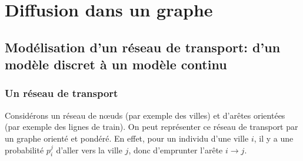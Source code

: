 \documentclass[a4paper]{article}
\theoremstyle{plain}
\theoremstyle{definition}
\theoremstyle{remark}
\begin{document}
\section{Diffusion dans un graphe}
\subsection{Modélisation d'un réseau de transport: d'un modèle discret à un modèle continu}
\subsubsection{Un réseau de transport}
Considérons un réseau de nœuds (par exemple des villes) et d’arêtes orientées (par exemple des lignes de train). On peut représenter ce réseau de transport par un graphe orienté et pondéré. En effet, pour un individu d'une ville $i$, il y a une probabilité $p_i^j$ d'aller vers la ville $j$, donc d'emprunter l’arête $i\rightarrow j$. 

\end{document}
